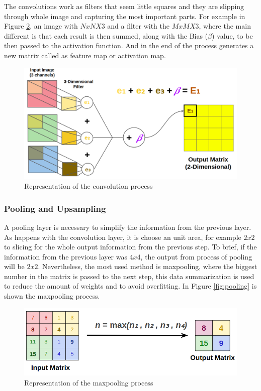The convolutions work as filters that seem little squares and they are slipping through whole image and capturing the most important parts. For example in Figure \ref{fig:bias}, an image with $NxNX3$ and a filter with the $MxMX3$, where the main different is that each result is then summed, along with the Bias ($\beta$) value, to be then passed to the activation function. And in the end of the process generates a new matrix called as feature map or activation map.


\begin{figure}[H]
\centering
\includegraphics[scale=0.35]{imagens/three_dim_conv_2.png}
\caption{Representation of the convolution process}
\label{fig:bias}
\end{figure}




\subsubsection{Pooling and Upsampling}\label{sub:pooling}

A pooling layer is necessary to simplify the information from the previous layer. As happens with the convolution layer, it is choose an unit area, for example $2x2$ to slicing for the whole output information from the previous step. To brief, if the information from the previous layer was $4x4$, the output from process of pooling will be $2x2$. Nevertheless, the most used method is maxpooling, where the biggest number in the matrix is passed to the next step, this data summarization is used to reduce the amount of weights and to avoid overfitting. In Figure \ref{fig:pooling} is shown the maxpooling process.

\begin{figure}[H]
\centering
\includegraphics[scale=0.35]{imagens/max_pooling.png}
\caption{Representation of the maxpooling process}
\label{fig:bias}
\end{figure}




